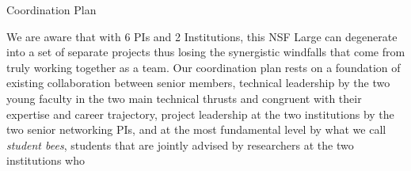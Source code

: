 \documentclass[10pt]{article}
\begin{document}
 \begin{Large}
\begin{center}
Coordination Plan
\end{center}
\end{Large}



We are aware that with 6 PIs and 2 Institutions, this NSF Large can degenerate into a set of
separate projects thus losing the synergistic windfalls that come from truly working together as
a team. Our coordination plan rests on a foundation of existing collaboration between senior members,  technical leadership by the two young faculty in the two main technical thrusts and
congruent with their expertise and career trajectory, project leadership at the two
institutions by the two senior networking PIs, and at the most fundamental level by what we
call \emph{student bees}, students that are jointly advised by researchers at the two institutions who
\end{document}
